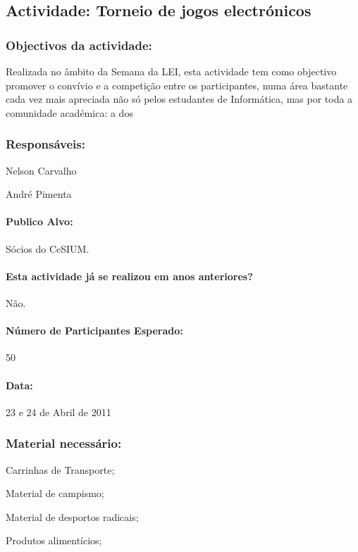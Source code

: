 \subsection{Actividade: Torneio de jogos electrónicos} 

\subsubsection*{Objectivos da actividade:}
Realizada no âmbito da Semana da LEI, esta actividade tem como objectivo promover o convívio e a competição entre os participantes, numa área bastante cada vez mais apreciada não só pelos estudantes de Informática, mas por toda a comunidade académica: a dos 

\subsubsection*{Responsáveis:}
\begin{itemizedash}
	\item{Nelson Carvalho}
	\item{André Pimenta}
\end{itemizedash}

\paragraph{Publico Alvo: }
Sócios do CeSIUM.

\paragraph{Esta actividade já se realizou em anos anteriores?}
Não.

\paragraph{Número de Participantes Esperado:}
50

\paragraph{Data:} 23 e 24 de Abril de 2011

\subsubsection*{Material necessário:}
\begin{itemizedash}
	\item{Carrinhas de Transporte;}
	\item{Material de campismo;}
	\item{Material de desportos radicais;}
	\item{Produtos alimentícios;}
\end{itemizedash}

